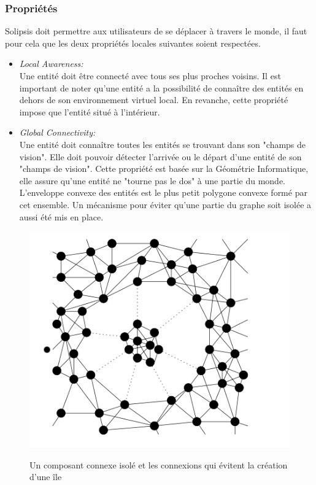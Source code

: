 		\subsubsection{Propriétés}
	Solipsis doit permettre aux utilisateurs de se déplacer à travers le monde, il faut pour cela que les deux propriétés locales suivantes soient respectées.
	\begin{itemize}
	\renewcommand{\labelitemi}{$\bullet$}
		\item \textit{Local Awareness:}\\
		Une entité doit être connecté avec tous ses plus proches voisins. Il est important de noter qu'une entité a la possibilité de connaître des entités en dehors de son environnement virtuel local. En revanche, cette propriété impose que l'entité situé à l'intérieur.	
		\item \textit{Global Connectivity:}\\
		Une entité doit connaître toutes les entités se trouvant dans son "champs de vision". Elle doit pouvoir détecter l'arrivée ou le départ d'une entité de son "champs de vision". Cette propriété est basée sur la Géométrie Informatique, elle assure qu'une entité ne "tourne pas le dos" à une partie du monde. L'enveloppe convexe des entités est le plus petit polygone convexe formé par cet ensemble. Un mécanisme pour éviter qu'une partie du graphe soit isolée a aussi été mis en place.\\
	\end{itemize}
        \vspace{1cm}
	\begin{figure}[!h]
	\centering
        \includegraphics[scale=0.9]{../Images/composant_isole1.png}\\
        \caption{Un composant connexe isolé et les connexions qui évitent la création d'une île}
        \label{Envelop_Convex}
        \end{figure}

